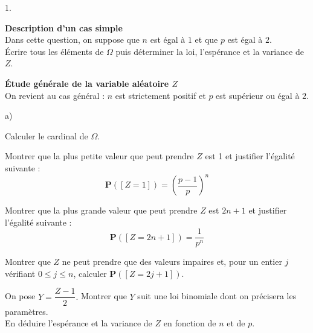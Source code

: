 \documentclass[11pt]{article}%
\begin{document}
\begin{noliste}{1.}
 \setlength{\itemsep}{4mm}
\item \textbf{Description d'un cas simple}\\
Dans cette question, on suppose que $n$ est égal à $1$ et que $p$ est
égal à 
$2$.\\
Écrire tous les éléments de $\Omega $ puis déterminer la loi,
l'espérance et
la variance de $Z$.

\item \textbf{Étude générale de la variable aléatoire $Z$}\\
On revient au cas général : $n$ est strictement positif et $p$ est
supérieur
ou égal à $2$.

\begin{noliste}{a)}
 \setlength{\itemsep}{2mm}
\item Calculer le cardinal de $\Omega $.

\item Montrer que la plus petite valeur que peut prendre $Z$ est 1 et
justifier l'égalité suivante :
\[
\mathbf{P}([Z = 1]) = \left( {\dfrac{p-1}{p}}\right) ^{n}
\]

\item Montrer que la plus grande valeur que peut prendre $Z$ est $2n +
1$ et
justifier l'égalité suivante :
\[
\mathbf{P}([Z = 2n + 1]) = \dfrac{1}{p^{n}}
\]

\item Montrer que $Z$ ne peut prendre que des valeurs impaires et, pour
un
entier $j$ vérifiant $0\leq j\leq n$, calculer $\mathbf{P}([Z = 2j +
1])$.

\item On pose $Y = \dfrac{Z-1}{2}.$ Montrer que $Y$ suit une loi
binomiale
dont on précisera les paramètres. \\
En déduire l'espérance et la variance de $Z$ en fonction de $n$ et de
$p$.
\end{noliste}
\end{noliste}

\label{fin}
\end{document}
